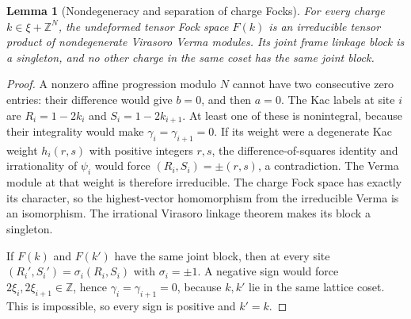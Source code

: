 \documentclass[11pt,a4paper]{article}
\numberwithin{equation}{section}
\newtheorem{lemma}[theorem]{Lemma}
\theoremstyle{definition}\newtheorem{definition}[theorem]{Definition}
\theoremstyle{remark}\newtheorem{remark}[theorem]{Remark}
\begin{document}
\begin{lemma}[Nondegeneracy and separation of charge Focks]
\label{g:lem:periodic-focks}
For every charge $k\in\xi+\mathbb Z^N$, the undeformed tensor Fock space
$F(k)$ is an irreducible tensor product of nondegenerate Virasoro Verma
modules. Its joint frame linkage block is a singleton, and no other charge
in the same coset has the same joint block.
\end{lemma}
\begin{proof}
A nonzero affine progression modulo $N$ cannot have two consecutive zero
entries: their difference would give $b=0$, and then $a=0$.
The Kac labels at site $i$ are
$R_i=1-2k_i$ and $S_i=1-2k_{i+1}$. At least one of these is nonintegral,
because their integrality would make $\gamma_i=\gamma_{i+1}=0$.
If its weight were a degenerate Kac weight $h_i(r,s)$ with positive
integers $r,s$, the difference-of-squares identity and irrationality of
$\psi_i$ would force $(R_i,S_i)=\pm(r,s)$, a contradiction. The Verma
module at that weight is therefore irreducible. The charge Fock space has
exactly its character, so the highest-vector homomorphism from the
irreducible Verma is an isomorphism. The irrational Virasoro
linkage theorem makes its block a singleton.

If $F(k)$ and $F(k')$ have the same joint block, then at every site
$(R_i',S_i')=\sigma_i(R_i,S_i)$ with $\sigma_i=\pm1$. A negative sign
would force $2\xi_i,2\xi_{i+1}\in\mathbb Z$, hence
$\gamma_i=\gamma_{i+1}=0$, because $k,k'$ lie in the same lattice coset.
This is impossible, so every sign is positive and $k'=k$.
\end{proof}
\end{document}
